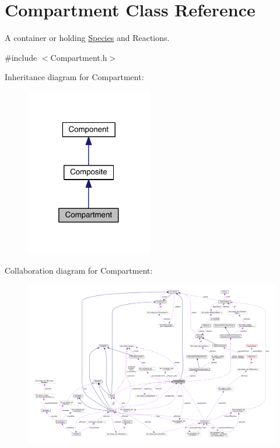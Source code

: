 \hypertarget{classCompartment}{\section{Compartment Class Reference}
\label{classCompartment}
}


A container or holding \hyperlink{classSpecies}{Species} and Reactions.  




{\ttfamily \#include $<$Compartment.\+h$>$}



Inheritance diagram for Compartment\+:\nopagebreak
\begin{figure}[H]
\begin{center}
\leavevmode
\includegraphics[width=157pt]{classCompartment__inherit__graph}
\end{center}
\end{figure}


Collaboration diagram for Compartment\+:
\nopagebreak
\begin{figure}[H]
\begin{center}
\leavevmode
\includegraphics[width=350pt]{classCompartment__coll__graph}
\end{center}
\end{figure}
